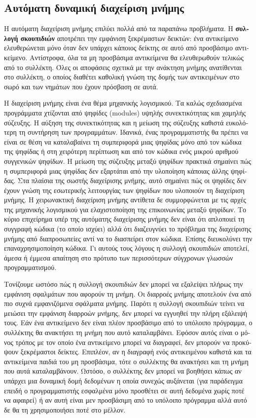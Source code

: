 \begin{greek}
\section{Αυτόματη δυναμική διαχείριση μνήμης}
Η αυτόματη διαχείριση μνήμης επιλύει πολλά από τα παραπάνω προβλήματα.
Η \textbf{συλλογή σκουπιδιών} αποτρέπει την εμφάνιση ξεκρέμαστων
δεικτών: ένα αντικείμενο ελευθερώνεται μόνο όταν δεν υπάρχει
κάποιος δείκτης σε αυτό από προσβάσιμο αντικείμενο. Αντίστροφα,
όλα τα μη προσβάσιμα αντικείμενα θα ελευθερωθούν τελικώς από το
συλλέκτη. Όλες οι αποφάσεις σχετικά με την ανάκτηση μνήμης
ανατίθενται στο συλλέκτη, ο οποίος διαθέτει καθολική γνώση της
δομής των αντικειμένων στο σωρό και των νημάτων που έχουν πρόσβαση
σε αυτά.

Η διαχείριση μνήμης είναι ένα θέμα μηχανικής λογισμικού. Τα καλώς
σχεδιασμένα προγράμματα χτίζονται από ψηφίδες (modules) υψηλής
συνεκτικότητας και χαμηλής σύζευξης. Η αύξηση της συνεκτικότητας
και η μείωση της σύζευξης καθιστά ευκολότερη τη συντήρηση των
προγραμμάτων. Ιδανικά, ένας προγραμματιστής θα πρέπει να είναι
σε θέση να καταλαβαίνει τη συμπεριφορά μιας ψηφίδας μόνο από
τον κώδικα της ψηφίδας ή στη χειρότερη περίπτωση και από τον
κώδικα ενός μικρού αριθμού συγγενικών ψηφίδων. Η μείωση της
σύζευξης μεταξύ ψηφίδων πρακτικά σημαίνει πώς η συμπεριφορά
μιας ψηφίδας δεν εξαρτάται από την υλοποίηση κάποιας άλλης ψηφίδας.
Στα πλαίσια της σωστής διαχείρισης μνήμης, αυτό σημαίνει πώς
οι ψηφίδες δεν έχουν γνώση της εσωτερικής λειτουργίας των ψηφίδων
που υλοποιούν τη διαχείριση μνήμης. Η χειρωνακτική διαχείριση
μνήμης αντίθετα δε συμμορφώνεται με τις αρχές της μηχανικής
λογισμικού για ελαχιστοποίηση της επικοινωνίας μεταξύ ψηφίδων.
Το κύριο επιχείρημα υπέρ της αυτόματης διαχείρισης μνήμης δεν
είναι ότι απλοποιεί τη συγγραφή κώδικα (το οποίο ισχύει) αλλά
ότι διαζευγνύει το πρόβλημα της διαχείρισης μνήμης από διαπροσωπείες
αντί να το διασπείρει στον κώδικα. Επίσης διευκολύνει την επαναχρησιμοποίηση
κώδικα. Γι αυτούς τους λόγους η συλλογή σκουπιδιών αποτελεί, άμεσα
ή έμμεσα απαίτηση στο πρότυπο των περισσότερων σύγχρονων γλωσσών
προγραμματισμού. 

Τονίζουμε ωστόσο πώς η συλλογή σκουπιδιών δεν μπορεί να εξαλείψει
πλήρως την εμφάνιση σφαλμάτων που αφορούν τη μνήμη. Οι διαρροές
μνήμης αποτελούν ένα από πιο συχνά εμφανιζόμενα σφάλματα μνήμης.
Παρότι η συλλογή σκουπιδιών τείνει να μειώσει την εμφάνιση διαρροών
μνήμης, δεν μπορεί να εγγυηθεί την πλήρη εξάλειψή τους. Εάν ένα
αντικείμενο δεν είναι πλέον προσβάσιμο από το υπόλοιπο πρόγραμμα,
ο συλλέκτης θα ανακτήσει τη μνήμη που αυτό καταλαμβάνει. Εφόσον
αυτός είναι ο μόνος τρόπος με τον οποίο ένα αντικείμενο μπορεί
να διαγραφεί, δεν μπορούν να προκύψουν ξεκρέμαστοι δείκτες.
Επιπλέον, αν η διαγραφή ενός αντικειμένου καθιστά και τα αντικείμενα
παιδιά του μη προσβάσιμα, τότε ο συλλέκτης θα ανακτήσει και τη
μνήμη που αυτά καταλαμβάνουν. Ωστόσο, ο συλλέκτης δεν μπορεί να
βοηθήσει κάπως αν υπάρχει μια δυναμική δομή δεδομένων η οποία
συνεχώς αυξάνεται (για παράδειγμα επειδή ο προγραμματιστής εσφαλμένα
μόνο προσθέτει σε αυτή δεδομένα χωρίς ποτέ να αφαιρεί) ή αν αυτή
είναι μεν προσβάσιμη από το υπόλοιπο πρόγραμμα αλλά αυτό δε θα
τη χρησιμοποιήσει ποτέ στο μέλλον.


\end{greek}
